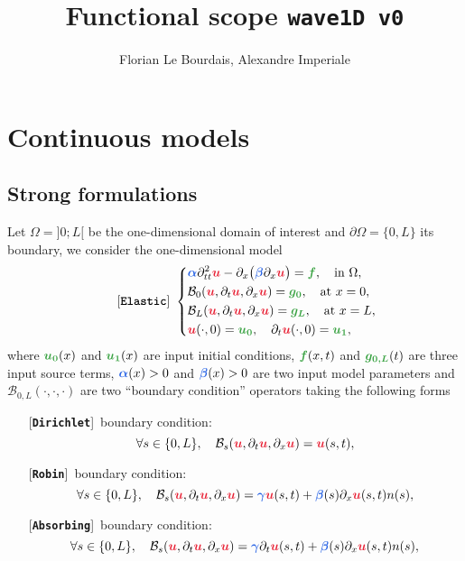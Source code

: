 \documentclass[11pt,a4paper]{article}
\title{Functional scope \texttt{wave1D v0}}
\author[1]{Florian Le Bourdais, Alexandre Imperiale}
\newcommand{\unknown}[1]{\bm{{\color{myred}{#1}}}}
\newcommand{\param}[1]{\bm{{\color{myhyperblue}{#1}}}}
\newcommand{\data}[1]{\bm{{\color{mygreen}{#1}}}}
\newcommand{\keyword}[1]{[\texttt{\textbf{#1}}]\!\,}
\begin{document}
% 

\maketitle

\section{Continuous models}
\subsection{Strong formulations}
Let $\Omega = ]0; L[$ be the one-dimensional domain of interest and $\partial\Omega = \{0, L\}$ its boundary, we consider the one-dimensional model
\begin{equation*}
\quad \quad
\keyword{Elastic}~
\left\lbrace
\begin{aligned}
& \param{\alpha}\partial^2_{tt} \unknown{u} - \partial_x\big( \param{\beta} \partial_x \unknown{u} \big) = \data{f},\quad \text{in }\Omega,\\
& \mathcal{B}_0(\unknown{u}, \partial_t \unknown{u}, \partial_x \unknown{u}) = \data{g_0},\quad \text{at } x = 0,\\
&\mathcal{B}_L(\unknown{u}, \partial_t \unknown{u}, \partial_x \unknown{u}) = \data{g_L},\quad \text{at } x = L,\\
& \unknown{u}(\cdot, 0) = \data{u_0},\quad \partial_t\unknown{u}(\cdot, 0) = \data{u_1},
\end{aligned}
\right.
\end{equation*}
where $\data{u_0}(x)$ and $\data{u_1}(x)$ are input initial conditions, $\data{f}(x, t)$ and $\data{g_{0,L}}(t)$ are three input source terms, $\param{\alpha}(x) > 0$ and $\param{\beta}(x) > 0$ are two input model parameters and $\mathcal{B}_{0, L}(\cdot, \cdot, \cdot)$ are two ``boundary condition'' operators taking the following forms
\begin{itemize}
\item[] \keyword{Dirichlet} boundary condition: 
\begin{equation*}
\forall s \in\{0, L\},\quad \mathcal{B}_s(\unknown{u}, \partial_t \unknown{u}, \partial_x \unknown{u}) = \unknown{u}(s, t),
\end{equation*}
\item[] \keyword{Robin} boundary condition: 
\begin{equation*}
\forall s \in\{0, L\},\quad \mathcal{B}_s(\unknown{u}, \partial_t \unknown{u}, \partial_x \unknown{u}) = \param{\gamma}\unknown{u}(s, t) + \param{\beta}(s)\partial_x \unknown{u}(s, t) n(s),
\end{equation*}
\item[] \keyword{Absorbing} boundary condition:
\begin{equation*}
\forall s \in\{0, L\},\quad \mathcal{B}_s(\unknown{u}, \partial_t \unknown{u}, \partial_x \unknown{u}) = \param{\gamma} \partial_t \unknown{u}(s, t) + \param{\beta}(s)\partial_x \unknown{u}(s, t) n(s),
\end{equation*}
\end{itemize}
\end{document}
